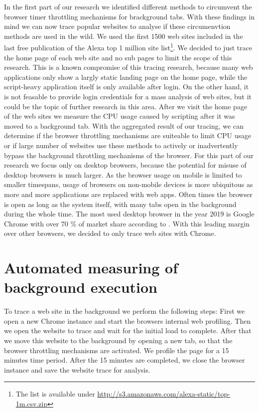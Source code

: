 \documentclass[
	ngerman,
	ruledheaders=section,%
	class=report,%
	thesis={type=bachelor},%
	accentcolor=9c,%
	custommargins=true,%
	marginpar=false,%
	parskip=half-,%
	fontsize=11pt,%
]{tudapub}
\begin{document}
  In the first part of our research we identified different methods to circumvent the browser timer throttling mechanisms for brackground tabs. With these findings in mind we can now trace popular websites to analyse if these circumenvtion methods are used in the wild. We used the first 1500 web sites included in the last free publication of the Alexa top 1 million site list\footnote{The list is available under \url{http://s3.amazonaws.com/alexa-static/top-1m.csv.zip}}. We decided to just trace the home page of each web site and no sub pages to limit the scope of this research. This is a known compromise of this tracing research, because many web applications only show a largly static landing page on the home page, while the script-heavy application itself is only available after login. On the other hand, it is not feasable to provide login credentials for a mass analysis of web sites, but it could be the topic of further research in this area. After we visit the home page of the web sites we measure the CPU usage caused by scripting after it was moved to a background tab. With the aggregated result of our tracing, we can determine if the browser throttling mechanisms are suiteable to limit CPU usage or if large number of websites use these methods to actively or inadvertently bypass the background throttling mechanisms of the browser. For this part of our research we focus only on desktop browsers, because the potential for misuse of desktop browsers is much larger. As the browser usage on mobile is limited to smaller timespans, usage of browsers on non-mobile devices is more ubiquitous as more and more applications are replaced with web apps. Often times the browser is open as long as the system itself, with many tabs open in the background during the whole time. The most used desktop browser in the year 2019 is Google Chrome with over 70 \% of market share according to \cite{statcounter-desktop-browser-market-share}. With this leading margin over other browsers, we decided to only trace web sites with Chrome.
  
  \section{Automated measuring of background execution}

  To trace a web site in the background we perform the following steps: First we open a new Chrome instance and start the browsers internal web profiling. Then we open the website to trace and wait for the initial load to complete. After that we move this website to the background by opening a new tab, so that the browser throttling mechanisms are activated. We profile the page for a 15 minutes time period. After the 15 minutes are completed, we close the browser instance and save the website trace for analysis.
    
\end{document}
